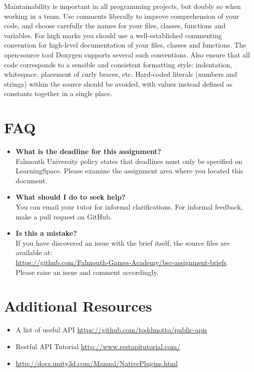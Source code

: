 \documentclass{../fal_assignment}
\begin{document}
Maintainability is important in all programming projects, but doubly so when working in a team. Use comments liberally to improve comprehension of your code, and choose carefully the names for your files, classes, functions and variables. For high marks you should use a well-established commenting convention for high-level documentation of your files, classes and functions. The open-source tool Doxygen supports several such conventions. Also ensure that all code corresponds to a sensible and consistent formatting style: indentation, whitespace, placement of curly braces, etc. Hard-coded literals (numbers and strings) within the source should be avoided, with values instead defined as constants together in a single place.

\section*{FAQ}

\begin{itemize}
	\item 	\textbf{What is the deadline for this assignment?} \\ 
    		Falmouth University policy states that deadlines must only be specified on LearningSpace. Please examine the assignment area where you located this document.
    		
	\item 	\textbf{What should I do to seek help?} \\ 
    		You can email your tutor for informal clarifications. For informal feedback, make a pull request on GitHub. 
    		
    	\item 	\textbf{Is this a mistake?} \\ 	
    		If you have discovered an issue with the brief itself, the source files are available at: \\
    		\url{https://github.com/Falmouth-Games-Academy/bsc-assignment-briefs}.\\
    		 Please raise an issue and comment accordingly.
\end{itemize}

\section*{Additional Resources}

\begin{itemize}
    \item A list of useful API
        \url{https://github.com/toddmotto/public-apis}
    \item Restful API Tutorial
        \url{http://www.restapitutorial.com/}
    \item \url{http://docs.unity3d.com/Manual/NativePlugins.html}
\end{itemize}
\end{document}

